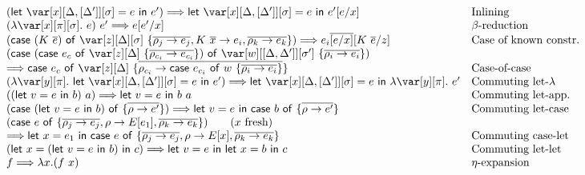 \documentclass[acmsmall,review,anonymous]{acmart}
\newcommand{\llet}[2]{\mathsf{let}~#1~\mathsf{in}~#2}
\newcommand{\ccase}[2]{\mathsf{case}~#1~\mathsf{of}~#2}
\begin{document}
\begin{figure}[t]

  {\small
  \[
    \begin{array}{ll}
   (\llet{\xD = e}{e'} )  \Longrightarrow \llet{\xD =       e}{e'[e/x]} &                    \mbox{Inlining}\\
       (\lambda \x[\pi][\s].~e)~e'  \Longrightarrow e[e'/x]  &                \mbox{$\beta$-reduction}\\
      (\ccase{(K~\ov{e})}{\z[\D][\s]~\{\overline{\rho_j\to e_j}, K~\ov{x} \to e_i, \overline{\rho_k\to e_k}\}} )\Longrightarrow  e_i\ov{[e/x]}[K~\ov{e}/z] &
                                  \mbox{Case of known constr.}\\
      (\ccase{(\ccase{e_c}{\z[\D]~\{\ov{\rho_{c_i}\to e_{c_i}}\}})}{\var[w][\irr{\D,\D'}][\s']~\{\ov{\rho_i\to e_i}\}})\\
            \Longrightarrow 
      \ccase{e_c}{\z[\D]~\{\ov{\rho_{c_i} \to \ccase{e_{c_i}}{w~\{\ov{\rho_i\to e_i}\}}}\}}
      & \mbox{Case-of-case}\\
      (\lambda \y[\pi].~\llet{\xD = e}{e'})
      \Longrightarrow
      \llet{\xD=e}{\lambda\y[\pi].~e'} & \mbox{Commuting let-$\lambda$}\\
      ((\llet{v = e}{b})~a) \Longrightarrow \llet{v = e}{b~a} &\mbox{Commuting let-app.}\\
      (\ccase{(\llet{v = e}{b})}{\{\overline{\rho\to e'}\}}) \Longrightarrow
      \llet{v =  e}{\ccase{b}{\{\overline{\rho\to e'}\}}}
                               &
                                 \mbox{Commuting let-case}\\
      (\ccase{e}{\{\overline{\rho_j\to e_j}, \rho \to E[e_1],
      \overline{\rho_k\to e_k}\}} ) \qquad (\mbox{$x$ fresh}) \\
     \Longrightarrow \llet{x = e_1}{\ccase{e}{\{\overline{\rho_j\to e_j}, \rho \to E[x], \overline{\rho_k\to e_k}\}}} 
                                                                        & \mbox{Commuting case-let}\\
      (\llet{x = (\llet{v = e}{b})}{c}) \Longrightarrow \llet{v = e}{\llet{x = b}{c}}
                                                                      & \mbox{Commuting let-let}\\
      f \Longrightarrow \lambda x.(f~x) & \mbox{$\eta$-expansion}\\

\end{array}\]}
\end{figure}
\end{document}
